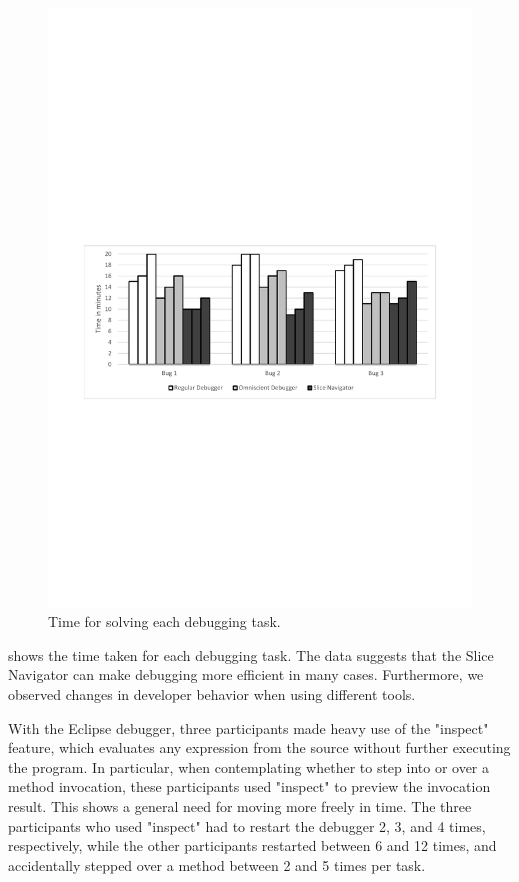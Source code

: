 \begin{figure}
	\centering
		\includegraphics[width=\linewidth, clip, trim={20mm 110mm 19mm 125mm}]{img/chart-times.pdf}
	\caption{Time for solving each debugging task.}
	\label{fig:charttimes}
\end{figure}

 shows the time taken for each debugging task.
The data suggests that the Slice Navigator can make debugging more efficient in many cases.
Furthermore, we observed changes in developer behavior when using different tools.

With the Eclipse debugger, three participants made heavy use of the "inspect" feature, which evaluates any expression from the source without further executing the program.
In particular, when contemplating whether to step into or over a method invocation, these participants used "inspect" to preview the invocation result.
This shows a general need for moving more freely in time.
The three participants who used "inspect" had to restart the debugger 2, 3, and 4 times, respectively, while the other participants restarted between 6 and 12 times, and accidentally stepped over a method between 2 and 5 times per task.


